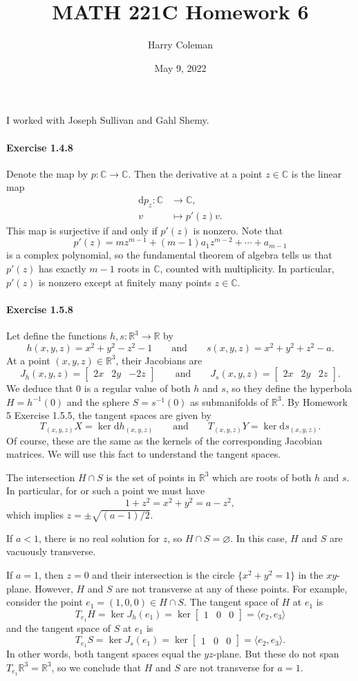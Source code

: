 \documentclass[12pt]{article}
\renewcommand{\maketitle}{\thispagestyle{title}}
\newcommand{\pnum}[1]{\paragraph{#1}}
\theoremstyle{definition}
\newcommand{\isp}[1]{\qquad\text{#1}\qquad}
\newcommand{\R}{\mathbb{R}}
\newcommand{\C}{\mathbb{C}}
\renewcommand{\emptyset}{\varnothing}
\newcommand{\<}{\langle}
\renewcommand{\>}{\rangle}
\newcommand{\dd}{\mathrm{d}}
\newcommand{\mat}[1]{\begin{bmatrix}#1\end{bmatrix}}
\begin{document}
\title{MATH 221C Homework 6}
\author{Harry Coleman}
\date{May 9, 2022}
\maketitle

I worked with Joseph Sullivan and Gahl Shemy.

\pnum{Exercise 1.4.8}

Denote the map by $p : \C \to \C$.
Then the derivative at a point $z \in \C$ is the linear map
\begin{align*}
    \dd{p}_z : \C &\longrightarrow \C, \\
        v &\longmapsto p'(z)v.
\end{align*}
This map is surjective if and only if $p'(z)$ is nonzero.
Note that
\[
    p'(z) = mz^{m-1} + (m-1)a_1 z^{m-2} + \cdots + a_{m-1}
\]
is a complex polynomial, so the fundamental theorem of algebra tells us that $p'(z)$ has exactly $m-1$ roots in $\C$, counted with multiplicity.
In particular, $p'(z)$ is nonzero except at finitely many points $z \in \C$.





\pnum{Exercise 1.5.8}

Let define the functions $h, s : \R^3 \to \R$ by
\[
    h(x, y, z) = x^2 + y^2 - z^2 - 1
    \isp{and}
    s(x, y, z) = x^2 + y^2 + z^2 - a.
\]
At a point $(x, y, z) \in \R^3$, their Jacobians are
\[
    J_h(x, y, z) = \mat{2x & 2y & -2z}
    \isp{and}
    J_s(x, y, z) = \mat{2x & 2y & 2z}.
\]
We deduce that $0$ is a regular value of both $h$ and $s$, so they define the hyperbola $H = h^{-1}(0)$ and the sphere $S = s^{-1}(0)$ as submanifolds of $\R^3$.
By Homework 5 Exercise 1.5.5, the tangent spaces are given by
\[
    T_{(x, y, z)}X = \ker\dd{h}_{(x, y, z)}
    \isp{and}
    T_{(x, y, z)}Y = \ker\dd{s}_{(x, y, z)}.
\]
Of course, these are the same as the kernels of the corresponding Jacobian matrices.
We will use this fact to understand the tangent spaces.

The intersection $H \cap S$ is the set of points in $\R^3$ which are roots of both $h$ and $s$.
In particular, for or such a point we must have
\[
    1 + z^2 = x^2 + y^2 = a - z^2,
\]
which implies $z = \pm\sqrt{(a - 1)/2}$.

If $a < 1$, there is no real solution for $z$, so $H \cap S = \emptyset$.
In this case, $H$ and $S$ are vacuously transverse.

If $a = 1$, then $z = 0$ and their intersection is the circle $\{x^2 + y^2 = 1\}$ in the $xy$-plane.
However, $H$ and $S$ are not transverse at any of these points.
For example, consider the point $e_1 = (1, 0, 0) \in H \cap S$.
The tangent space of $H$ at $e_1$ is
\[
    T_{e_1}H
        = \ker J_h(e_1)
        = \ker \mat{1 & 0 & 0}
        = \<e_2, e_3\>
\]
and the tangent space of $S$ at $e_1$ is
\[
    T_{e_1}S
        = \ker J_s(e_1)
        = \ker \mat{1 & 0 & 0}
        = \<e_2, e_3\>.
\]
In other words, both tangent spaces equal the $yz$-plane.
But these do not span $T_{e_1}\R^3 = \R^3$, so we conclude that $H$ and $S$ are not transverse for $a = 1$.
\end{document}
